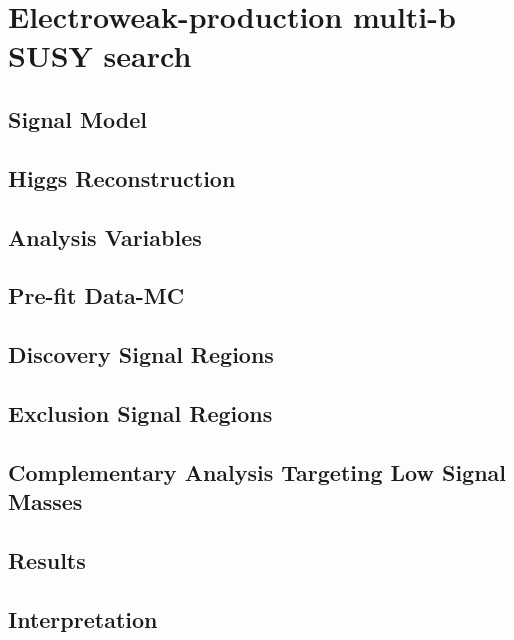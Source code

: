 \chapter{Electroweak-production multi-b SUSY search}
\label{chap:ewk_prod}


\section{Signal Model}

\section{Higgs Reconstruction}

\section{Analysis Variables}


\section{Pre-fit Data-MC}


\section{Discovery Signal Regions}


\section{Exclusion Signal Regions}


\section{Complementary Analysis Targeting Low Signal Masses}


\section{Results}


\section{Interpretation}